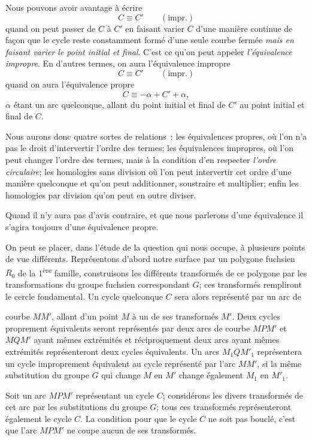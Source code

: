 \documentclass{article}
\begin{document}
Nous pouvons avoir avantage à écrire
\[ C \equiv C' \qquad (\text{impr.}) \]
quand on peut passer de $C$ à $C'$ en faisant varier $C$ d'une manière continue de façon que le cycle reste constamment formé d'une seule courbe fermée \emph{mais en faisant varier le point initial et final}. C'est ce qu'on peut appeler \emph{l'équivalence impropre}. En d'autres termes, on aura l'équivalence impropre
\[ C \equiv C' \qquad (\text{impr.}) \]
quand on aura l'équivalence propre
\[ C \equiv -\alpha + C' + \alpha, \]
$\alpha$ étant un arc quelconque, allant du point initial et final de $C'$ au point initial et final de $C$.

Nous aurons donc quatre sortes de relations~: les équivalences propres, où l'on n'a pas le droit d'intervertir l'ordre des termes; les équivalences impropres, où l'on peut changer l'ordre des termes, mais à la condition d'en respecter \emph{l'ordre circulaire}; les homologies sans division où l'on peut intervertir cet ordre d'une manière quelconque et qu'on peut additionner, soustraire et multiplier; enfin les homologies par division qu'on peut en outre diviser.

Quand il n'y aura pas d'avis contraire, et que nous parlerons d'une équivalence il s'agira toujours d'une équivalence propre.

On peut se placer, dans l'étude de la question qui nous occupe, à plusieurs points de vue différents. Représentons d'abord notre surface par un polygone fuchsien $R_{0}$ de la 1\textsuperscript{ère} famille, construisons les différents transformés de ce polygone par les transformations du groupe fuchsien correspondant $G$; ces transformés rempliront le cercle fondamental. Un cycle quelconque $C$ sera alors représenté par un arc de

courbe $MM'$, allant d'un point $M$ à un de ses transformés $M'$. Deux cycles proprement équivalents seront représentés par deux arcs de courbe $MPM'$ et $MQM'$ ayant mêmes extrémités et réciproquement deux arcs ayant mêmes extrémités représenteront deux cycles équivalents. Un arcs $M_{1}QM'_{1}$ représentera un cycle improprement équivalent au cycle représenté par l'arc $MM'$, si la même substitution du groupe $G$ qui change $M$ en $M'$ change également $M_{1}$ en $M'_{1}$.

Soit un arc $MPM'$ représentant un cycle $C$; considérons les divers transformés de cet arc par les substitutions du groupe $G$; tous ces transformés représenteront également le cycle $C$. La condition pour que le cycle $C$ ne soit pas bouclé, c'est que l'arc $MPM'$ ne coupe aucun de ses transformés.
\end{document}
